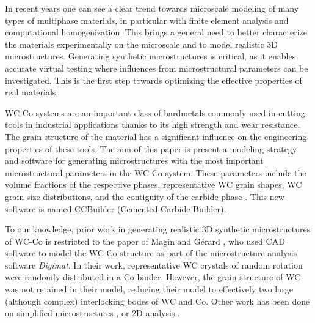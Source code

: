 \documentclass[3p,12pt]{elsarticle}
\begin{document}
In recent years one can see a clear trend towards microscale modeling of many types of multiphase materials, in particular with finite element analysis and computational homogenization.
This brings a general need to better characterize the materials experimentally on the microscale and to model realistic 3D microstructures.
Generating synthetic microstructures is critical, as it enables accurate virtual testing where influences from microstructural parameters can be investigated.
This is the first step towards optimizing the effective properties of real materials.

WC-Co systems are an important class of hardmetals commonly used in cutting tools in industrial applications thanks to its high strength and wear resistance.
The grain structure of the material has a significant influence on the engineering properties of these tools.
The aim of this paper is present a modeling strategy and software for generating microstructures with the most important microstructural parameters in the WC-Co system.
These parameters include the volume fractions of the respective phases, representative WC grain shapes, WC grain size distributions, and the contiguity of the carbide phase \cite{spiegler_finite_1992,lay_microstructure_2014}. This new software is named CCBuilder (Cemented Carbide Builder).

To our knowledge, prior work in generating realistic 3D synthetic microstructures of WC-Co is restricted to the paper of Magin and G{\'e}rard \cite{magin_microstructural_2009}, who used CAD software to model the WC-Co structure as part of the microstructure analysis software \textit{Digimat}.
In their work, representative WC crystals of random rotation were randomly distributed in a Co binder.
However, the grain structure of WC was not retained in their model, reducing their model to effectively two large (although complex) interlocking bodes of WC and Co.
Other work has been done on simplified microstructures \cite{mari_finite_2015, livescu_measurement_2005}, or 2D analysis \cite{chen_statistics_2013,ozden_mesoscopical_2015}.

\end{document}
